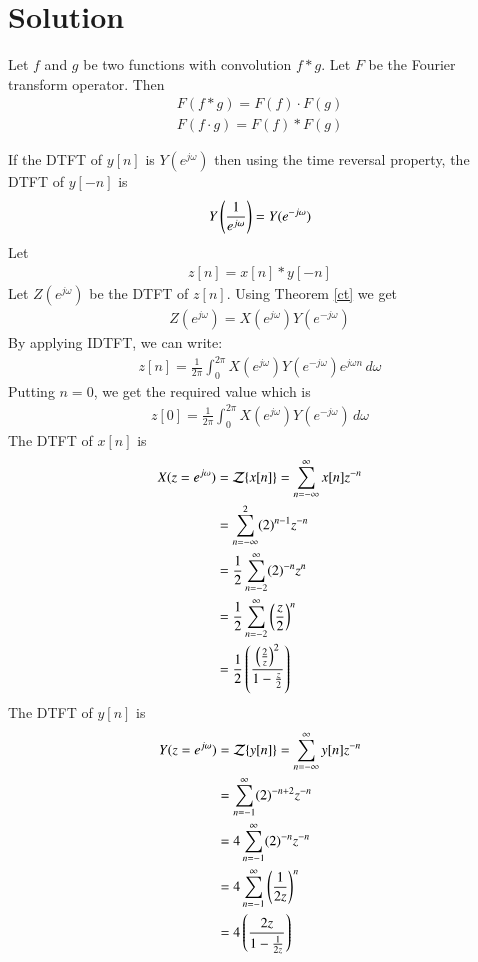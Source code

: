 \documentclass[journal,12pt,twocolumn]{IEEEtran}
\begin{document}
\section{Solution}
\begin{theorem} \label{ct}
Let $f$ and $g$ be two functions with convolution $f*g$. Let $F$ be the Fourier transform operator. Then
\begin{align}
F(f * g)=F(f) \cdot F(g)\\
F(f \cdot g)=F(f) * F(g)
\end{align}
\end{theorem}
If the DTFT of $y[n]$ is $Y(e^{j\omega})$  then using the time reversal property, the DTFT of $y[-n]$ is 
\begin{align}
Y\left(\frac{1}{e^{j\omega}}\right)=Y(e^{-j\omega})  
\end{align}
Let 
\begin{align} \label{convolu}
    z[n]=x[n]*y[-n]
\end{align}
Let $Z(e^{j\omega})$ be the DTFT of $z[n]$. Using Theorem \ref{ct} we get
\begin{align}
  Z(e^{j\omega})= X(e^{j\omega}) Y(e^{-j\omega}) 
\end{align}
By applying IDTFT, we can write:
\begin{align}
z[n]=\frac{1}{2\pi} \int_{0}^{2\pi} X(e^{j\omega}) Y(e^{-j\omega}) e^{j\omega n}\, d\omega  
\end{align}
Putting $n=0$, we get the required value which is
\begin{align}
z[0]=\frac{1}{2\pi} \int_{0}^{2\pi} X(e^{j\omega}) Y(e^{-j\omega})\, d\omega 
\end{align}
The DTFT of $x[n]$ is
\begin{align}
    X(z=e^{j\omega})&={\mathcal {Z}}\{x[n]\}=\sum _{n=-\infty }^{\infty }x[n]z^{-n}\\
    &=\sum _{n=-\infty }^{2 }(2)^{n-1}z^{-n}\\
    &=\frac{1}{2}\sum _{n=-2 }^{\infty }(2)^{-n}z^{n}\\
    &=\frac{1}{2}\sum _{n=-2 }^{\infty }\left(\frac{z}{2}\right)^n\\
    &=\frac{1}{2}\left(\frac{\left(\frac{2}{z}\right)^2}{1-\frac{z}{2}}\right)
\end{align}
The DTFT of $y[n]$ is
\begin{align}
    Y(z=e^{j\omega})&={\mathcal {Z}}\{y[n]\}=\sum _{n=-\infty }^{\infty }y[n]z^{-n}\\
    &=\sum _{n=-1  }^{\infty}(2)^{-n+2}z^{-n}\\
    &=4\sum _{n=-1 }^{\infty }(2)^{-n}z^{-n}\\
    &=4\sum _{n=-1 }^{\infty }\left(\frac{1}{2z}\right)^n\\
    &=4\left(\frac{2z}{1-\frac{1}{2z}}\right)
\end{align}
\end{document}
